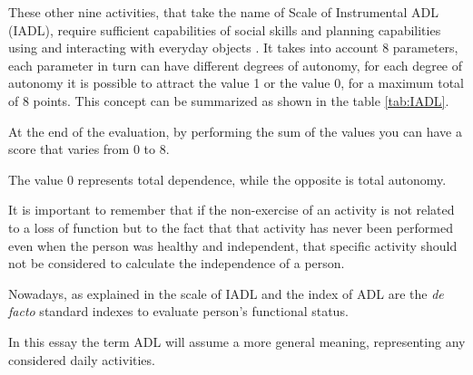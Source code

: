 \documentclass{thesisreport}
\begin{document}
 These other nine activities, that take the name of Scale of Instrumental ADL \cite{lawton1970assessment} (IADL), require sufficient capabilities of social skills and planning capabilities using and interacting with everyday objects \cite{buoncompagni2017towards}. 
It takes into account 8 parameters, each parameter in turn can have different degrees of autonomy, for each degree of autonomy it is possible to attract the value 1 or the value 0, for a maximum total of 8 points. This concept can be summarized as shown in the table \ref{tab:IADL}. 



At the end of the evaluation, by performing the sum of the values you can have a score that varies from 0 to 8.

The value 0 represents total dependence, while the opposite is total autonomy.

It is important to remember that if the non-exercise of an activity is not related to a loss of function but to the fact that that activity has never been performed even when the person was healthy and independent, that specific activity should not be considered to calculate the independence of a person.


Nowadays, as explained in \cite{bruno2014public} the scale of IADL and the index of ADL are the \textit{de facto} standard indexes to evaluate person’s functional status\cite{buoncompagni2017towards}. 

In this essay the term ADL will assume a more general meaning, representing any  considered daily activities. 
\end{document}
